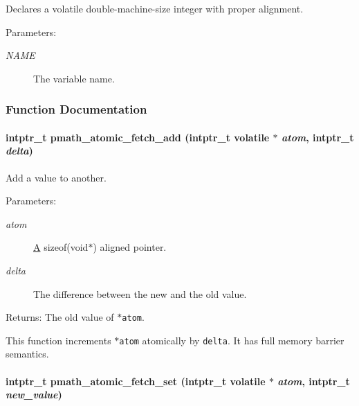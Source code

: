 Declares a volatile double-machine-size integer with proper alignment. 

\begin{Desc}
\item[Parameters:]
\begin{description}
\item[{\em NAME}]The variable name. \end{description}
\end{Desc}


\subsubsection{Function Documentation}
\hypertarget{group__atomic__ops_ge84bfddad2c018c6273b43164e6064ab}{
\paragraph[{pmath\_\-atomic\_\-fetch\_\-add}]{\setlength{\rightskip}{0pt plus 5cm}intptr\_\-t pmath\_\-atomic\_\-fetch\_\-add (intptr\_\-t volatile $\ast$ {\em atom}, \/  intptr\_\-t {\em delta})}\hfill}
\label{group__atomic__ops_ge84bfddad2c018c6273b43164e6064ab}


Add a value to another. 

\begin{Desc}
\item[Parameters:]
\begin{description}
\item[{\em atom}]\hyperlink{class_a}{A} sizeof(void$\ast$) aligned pointer. \item[{\em delta}]The difference between the new and the old value. \end{description}
\end{Desc}
\begin{Desc}
\item[Returns:]The old value of {\tt $\ast$atom}.\end{Desc}
This function increments {\tt $\ast$atom} atomically by {\tt delta}. It has full memory barrier semantics. \hypertarget{group__atomic__ops_gc39a86500a2344c9c7f7f42d2d069334}{
\paragraph[{pmath\_\-atomic\_\-fetch\_\-set}]{\setlength{\rightskip}{0pt plus 5cm}intptr\_\-t pmath\_\-atomic\_\-fetch\_\-set (intptr\_\-t volatile $\ast$ {\em atom}, \/  intptr\_\-t {\em new\_\-value})}\hfill}
\label{group__atomic__ops_gc39a86500a2344c9c7f7f42d2d069334}


